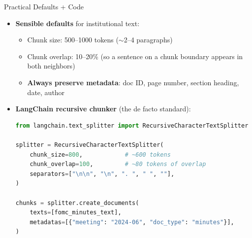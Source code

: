 \documentclass[10pt,english,aspectratio=169]{beamer}
\begin{document}
\begin{frame}[fragile]{Practical Defaults + Code}
\begin{itemize}
\item \textbf{Sensible defaults} for institutional text:
\begin{itemize}
    \item Chunk size: 500--1000 tokens ($\sim$2--4 paragraphs)
    \item Chunk overlap: 10--20\% (so a sentence on a chunk boundary appears in both neighbors)
    \item \textbf{Always preserve metadata}: doc ID, page number, section heading, date, author
\end{itemize}

\medskip
\item \textbf{LangChain recursive chunker} (the de facto standard):
\begin{lstlisting}[language=Python]
from langchain.text_splitter import RecursiveCharacterTextSplitter

splitter = RecursiveCharacterTextSplitter(
    chunk_size=800,            # ~600 tokens
    chunk_overlap=100,         # ~80 tokens of overlap
    separators=["\n\n", "\n", ". ", " ", ""],
)

chunks = splitter.create_documents(
    texts=[fomc_minutes_text],
    metadatas=[{"meeting": "2024-06", "doc_type": "minutes"}],
)
\end{lstlisting}
\end{itemize}
\end{frame}
\end{document}
